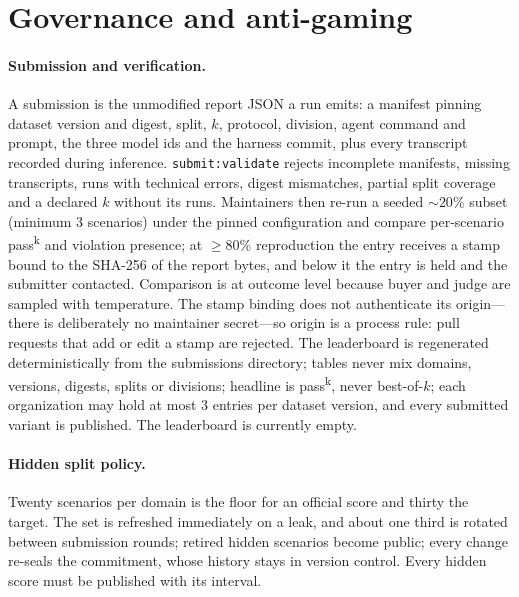 \documentclass[11pt]{article}
\newcommand{\passk}[1]{pass\textsuperscript{#1}}
\newcommand{\code}[1]{\texttt{#1}}
\begin{document}
\section{Governance and anti-gaming}
\label{sec:governance}

\paragraph{Submission and verification.} A submission is the unmodified report JSON a run emits: a
manifest pinning dataset version and digest, split, $k$, protocol, division, agent command and prompt,
the three model ids and the harness commit, plus every transcript recorded during inference.
\code{submit:validate} rejects incomplete manifests, missing transcripts, runs with technical errors,
digest mismatches, partial split coverage and a declared $k$ without its runs. Maintainers then re-run a
seeded ${\sim}20\%$ subset (minimum 3 scenarios) under the pinned configuration and compare per-scenario
\passk{k} and violation presence; at $\geq 80\%$ reproduction the entry receives a stamp bound to the
SHA-256 of the report bytes, and below it the entry is held and the submitter contacted. Comparison is at
outcome level because buyer and judge are sampled with temperature.
The stamp binding does not authenticate its origin---there is deliberately no maintainer
secret---so origin is a process rule: pull requests that add or edit a stamp are rejected.
The leaderboard is regenerated deterministically from the submissions directory; tables never mix
domains, versions, digests, splits or divisions; headline is \passk{k}, never best-of-$k$; each
organization may hold at most 3 entries per dataset version, and every submitted variant is published.
The leaderboard is currently empty.

\paragraph{Hidden split policy.} Twenty scenarios per domain is the floor for an official score and
thirty the target. The set is refreshed immediately on a leak, and about one third is rotated between
submission rounds; retired hidden scenarios become public; every change re-seals the commitment, whose
history stays in version control. Every hidden score must be published with its interval.
\end{document}
